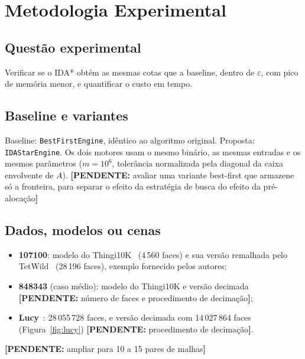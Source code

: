 \documentclass[9pt,a4paper,twocolumn]{extarticle}
\newif\ifmostrarorientacoes
\newcommand{\orientacao}[1]{%
  \ifmostrarorientacoes
    \par\smallskip
    \noindent\fcolorbox{black!35}{black!4}{%
      \parbox{0.94\columnwidth}{\fontsize{7.4}{8.2}\selectfont\textbf{Orientação aos autores:} #1}%
    }%
    \par\smallskip
  \fi
}
\newcommand{\pendente}[1]{{\color{red!70!black}\textbf{[PENDENTE:} #1\textbf{]}}}
\begin{document}
\section{Metodologia Experimental}
\orientacao{Explique como a hipótese será testada. Identifique baseline, dados/cenas,
parâmetros, métricas, quantidade de execuções, sementes e regras de comparação. Baseline
e proposta devem ser avaliadas sob condições equivalentes.}

\subsection{Questão experimental}
Verificar se o IDA* obtém as mesmas cotas que a baseline, dentro de $\varepsilon$,
com pico de memória menor, e quantificar o custo em tempo.

\subsection{Baseline e variantes}
Baseline: \texttt{BestFirstEngine}, idêntico ao algoritmo original. Proposta:
\texttt{IDAStarEngine}. Os dois motores usam o mesmo binário, as mesmas entradas e os
mesmos parâmetros ($m = 10^6$, tolerância normalizada pela diagonal da caixa
envolvente de $A$).
\pendente{avaliar uma variante best-first que armazene só a fronteira, para separar o
efeito da estratégia de busca do efeito da pré-alocação}

\subsection{Dados, modelos ou cenas}
\begin{itemize}
  \item \textbf{107100}: modelo do Thingi10K~\parencite{zhou2016thingi10k}
        (4\,560 faces) e sua versão remalhada pelo TetWild~\parencite{hu2018tetwild}
        (28\,196 faces), exemplo fornecido pelos autores;
  \item \textbf{848343} (caso médio): modelo do Thingi10K e versão decimada
        \pendente{número de faces e procedimento de decimação};
  \item \textbf{Lucy}~\parencite{stanford3dscan}: 28\,055\,728 faces, e versão
        decimada com 14\,027\,864 faces (Figura~\ref{fig:lucy})
        \pendente{procedimento de decimação}.
\end{itemize}
\pendente{ampliar para 10 a 15 pares de malhas}
\end{document}
